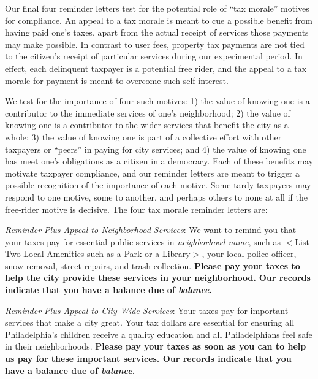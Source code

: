 \documentclass[12pt]{article}
\begin{document}
Our final four reminder letters test for the potential role of ``tax
morale'' motives for compliance.  An appeal to a tax morale is meant
to cue a possible benefit from having paid one's taxes, apart from the
actual receipt of services those payments may make possible.  In
contrast to user fees, property tax payments are not tied to the
citizen's receipt of particular services during our experimental
period.  In effect, each delinquent taxpayer is a potential free
rider, and the appeal to a tax morale for payment is meant to overcome
such self-interest.

We test for the importance of four such motives: 1) the value of
knowing one is a contributor to the immediate services of one's
neighborhood; 2) the value of knowing one is a contributor to
the wider services that benefit the city as a whole; 3) the
value of knowing one is part of a collective effort with other
taxpayers or ``peers'' in paying for city services; and 4)
the value of knowing one has meet one's obligations as a citizen in a
democracy.  Each of these benefits may motivate taxpayer
compliance, and our reminder letters are meant to trigger a possible
recognition of the importance of each motive.  Some tardy
taxpayers may respond to one motive, some to another, and perhaps
others to none at all if the free-rider motive is decisive.  The four
tax morale reminder letters are:

\bigskip

\noindent \textit{Reminder Plus Appeal to Neighborhood Services}: We
want to remind you that your taxes pay for essential public services
in \textit{neighborhood name}, such as $<$List Two Local Amenities
such as a Park or a Library$>$, your local police officer, snow
removal, street repairs, and trash collection.  \textbf{Please pay
  your taxes to help the city provide these services in your
  neighborhood.} \textbf{Our records indicate that you have a balance
  due of \textit{balance}.}

\bigskip

\noindent \textit{Reminder Plus Appeal to City-Wide Services}: Your
taxes pay for important services that make a city great. Your tax
dollars are essential for ensuring all Philadelphia's children receive
a quality education and all Philadelphians feel safe in their
neighborhoods.  \textbf{Please pay your taxes as soon as you can to
  help us pay for these important services.  Our records indicate that
  you have a balance due of \textit{balance}.}

\bigskip
\end{document}
